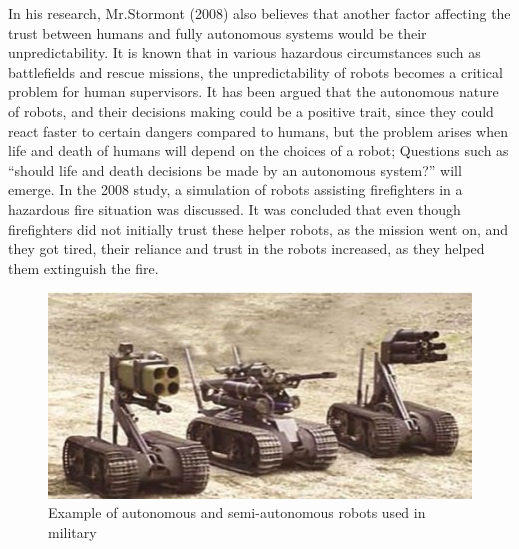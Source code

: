 \documentclass[runningheads,a4paper]{llncs}
\begin{document}
In his research, Mr.Stormont (2008) also believes that another factor affecting the trust between humans and fully autonomous systems would be their unpredictability. It is known that in various hazardous circumstances such as battlefields and rescue missions, the unpredictability of robots becomes a critical problem for human supervisors. It has been argued that the autonomous nature of robots, and their decisions making could be a positive trait, since they could react faster to certain dangers compared to humans, but the problem arises when life and death of humans will depend on the choices of a robot; Questions such as ``should life and death decisions be made
by an autonomous system?'' will emerge. In the 2008 study, a simulation of robots assisting firefighters in a hazardous fire situation was discussed. It was concluded that even though firefighters did not initially trust these helper robots, as the mission went on, and they got tired, their reliance and trust in the robots increased, as they helped them extinguish the fire. 
\begin{figure}
	\centering
		\includegraphics[scale=0.6]{Figures/3robots.jpg}
	\caption{Example of autonomous and semi-autonomous robots used in military \cite{autonomousArmedRobots}}
	\label{MilitaryRobots}
\end{figure}
\end{document}
